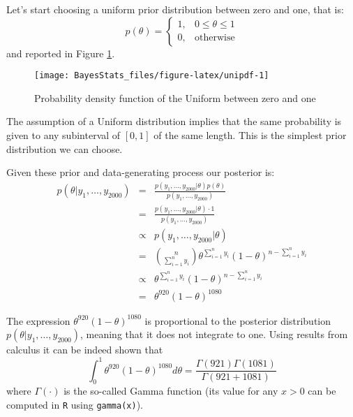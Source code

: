 \documentclass[
]{book}
\begin{document}
Let's start choosing a uniform prior distribution between zero and one, that is:
\[
p(\theta)=\left\{
\begin{array}{ll}
1, & 0\leq \theta \leq 1\\
0, & \mbox{otherwise}
\end{array}
\right.
\]
and reported in Figure \ref{fig:unipdf}.

\begin{figure}

{\centering \texttt{[image: BayesStats\_files/figure-latex/unipdf-1]} 

}

\caption{Probability density function of the Uniform between zero and one}\label{fig:unipdf}
\end{figure}

The assumption of a Uniform distribution implies that the same probability is given to any subinterval of \([0,1]\) of the same length. This is the simplest prior distribution we can choose.

Given these prior and data-generating process our posterior is:
\begin{eqnarray*}
p(\theta|y_1,\dots,y_{2000}) &=&\frac{p(y_1,\dots,y_{2000}|\theta)p(\theta)}{p(y_1,\dots,y_{2000})}\\
&=&\frac{p(y_1,\dots,y_{2000}|\theta)\cdot 1}{p(y_1,\dots,y_{2000})}\\
&\propto&p(y_1,\dots,y_{2000}|\theta)\\
&=& \binom{n}{\sum_{i=1}^ny_i}\theta^{\sum_{i=1}^ny_i}(1-\theta)^{n-\sum_{i=1}^ny_i}\\
&\propto& \theta^{\sum_{i=1}^ny_i}(1-\theta)^{n-\sum_{i=1}^ny_i}\\
&=& \theta^{920}(1-\theta)^{1080}
\end{eqnarray*}

The expression \(\theta^{920}(1-\theta)^{1080}\) is proportional to the posterior distribution \(p(\theta|y_1,\dots,y_{2000})\), meaning that it does not integrate to one. Using results from calculus it can be indeed shown that
\[
\int_{0}^{1}\theta^{920}(1-\theta)^{1080}d\theta=\frac{\Gamma(921)\Gamma(1081)}{\Gamma(921 + 1081)}
\]
where \(\Gamma(\cdot)\) is the so-called Gamma function (its value for any \(x>0\) can be computed in \texttt{R} using \texttt{gamma(x)}).
\end{document}
